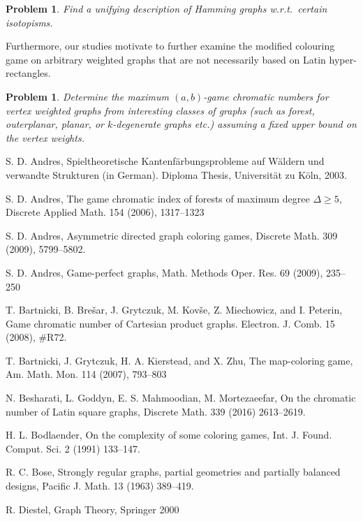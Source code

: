 \documentclass{article}
\newtheorem{prob}[thm]{Problem}
\begin{document}
\begin{prob}
Find a unifying description of Hamming graphs w.r.t.\ certain isotopisms.
\end{prob}

Furthermore, our studies motivate to further examine the modified colouring game on arbitrary weighted graphs that are not necessarily based on Latin hyper-rectangles.

\begin{prob}
Determine the maximum $(a,b)$-game chromatic numbers for vertex weighted graphs from interesting classes of graphs (such as forest, outerplanar, planar, or $k$-degenerate graphs etc.) 
assuming a fixed upper bound on the vertex weights.
\end{prob}

\begin{thebibliography}{00}
 S. D. Andres, Spieltheoretische Kantenf\"{a}rbungsprobleme auf W\"{a}ldern und verwandte Strukturen (in German). Diploma Thesis, Universit\"{a}t zu K\"{o}ln, 2003.

 S. D. Andres, The game chromatic index of forests of maximum degree $\Delta\ge5$, Discrete Applied Math. 154 (2006), 1317--1323

 S. D. Andres, Asymmetric directed graph coloring games, Discrete Math. 309 (2009), 5799--5802.

 S. D. Andres, Game-perfect graphs, Math. Methods Oper. Res. 69 (2009), 235--250

 T. Bartnicki, B. Bre\v{s}ar, J. Grytczuk, M. Kov\v{s}e, Z. Miechowicz, and I. Peterin, Game chromatic number of Cartesian product graphs. Electron. J. Comb. 15 (2008), \#R72.

 T. Bartnicki, J. Grytczuk, H. A. Kierstead, and X. Zhu, The map-coloring game, Am. Math. Mon. 114 (2007), 793--803

 N. Besharati, L. Goddyn, E. S. Mahmoodian, M. Mortezaeefar, On the chromatic number of Latin square graphs, Discrete Math. 339 (2016) 2613--2619.

 H. L. Bodlaender, On the complexity of some coloring games, Int. J. Found. Comput. Sci. 2 (1991) 133--147.

 R. C. Bose, Strongly regular graphs, partial geometries and partially balanced designs, Pacific J. Math. 13 (1963) 389--419.

 R. Diestel, Graph Theory, Springer 2000


\end{thebibliography}
\end{document}
